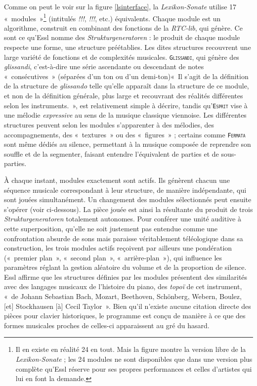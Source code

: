 \documentclass[a4paper,12pt]{article}
\newcommand{\guill}[1]{«~#1~»}
\begin{document}
Comme on peut le voir sur la figure \ref{lsinterface}, la \emph{Lexikon-Sonate} utilise 17 \guill{modules}\footnote{Il en existe en réalité 24 en tout. Mais la figure montre la version libre de la \emph{Lexikon-Sonate} ; les 24 modules ne sont disponibles que dans une version plus complète qu'Essl réserve pour ses propres performances et celles d'artistes qui lui en font la demande.} (intitulés \emph{!!!}, \emph{!!!}, etc.) équivalents. Chaque module est un algorithme, construit en combinant des fonctions de la \emph{RTC-lib}, qui génère. Ce sont ce qu'Essl nomme des \emph{Strukturgeneratoren} : le produit de chaque module respecte une forme, une structure préétablies. Les dites structures recouvrent une large variété de fonctions et de complexités musicales. \texttt{\textsc{Glissandi}}, qui génère des \emph{glissandi}, c'est-à-dire une série ascendante ou descendant de notes \guill{consécutives} (séparées d'un ton ou d'un demi-ton)\guill{Il s'agit de la définition de la structure de \emph{glissando} telle qu'elle apparaît dans la structure de ce module, et non de la définition générale, plus large et recouvrant des réalités différentes selon les instruments.}, est relativement simple à décrire, tandis qu'\texttt{\textsc{Esprit}} vise à une mélodie \emph{expressive} au sens de la musique classique viennoise. Les différentes structures peuvent selon les modules s'apparenter à des mélodies, des accompagnements, des \guill{textures} ou des \guill{figures} ; certains comme \texttt{\textsc{Fermata}} sont même dédiés au silence, permettant à la musique composée de reprendre son souffle et de la segmenter, faisant entendre l'équivalent de parties et de sous-parties.

À chaque instant, modules exactement sont actifs. Ils génèrent chacun une séquence musicale correspondant à leur structure, de manière indépendante, qui sont jouées simultanément. Un changement des modules sélectionnés peut ensuite s'opérer (voir ci-dessous). La pièce jouée est ainsi la résultante du produit de trois \emph{Strukturgeneratoren} totalement autonomes. Pour conférer une unité auditive à cette superposition, qu'elle ne soit justement pas entendue comme une confrontation absurde de sons mais paraisse véritablement téléologique dans sa construction, les trois modules actifs reçoivent par ailleurs une pondération (\guill{premier plan}, \guill{second plan}, \guill{arrière-plan}), qui influence les paramètres réglant la gestion aléatoire du volume et de la proportion de silence. Essl affirme que les structures définies par les modules présentent des similarités avec des langages musicaux de l'histoire du piano, des \emph{topo\"i} de cet instrument, \guill{de Johann Sebastian Bach, Mozart, Beethoven, Schönberg, Webern, Boulez, [et] Stockhausen [à] Cecil Taylor}. Bien qu'il n'existe aucune citation directe des pièces pour clavier historiques, le programme est conçu de manière à ce que des formes musicales proches de celles-ci apparaissent au gré du hasard.
\end{document}

